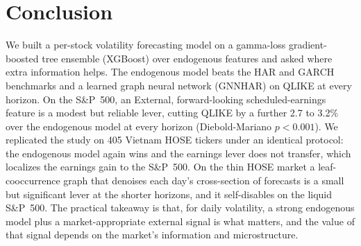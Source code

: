 \documentclass[runningheads]{llncs}
\begin{document}
\section{Conclusion}
We built a per-stock volatility forecasting model on a gamma-loss gradient-boosted tree ensemble
(XGBoost) over endogenous features and asked where extra information helps. The endogenous model beats
the HAR and GARCH benchmarks and a learned graph neural network (GNNHAR) on QLIKE at every horizon. On the
S\&P~500, an External, forward-looking scheduled-earnings feature is a modest but reliable lever, cutting
QLIKE by a further 2.7 to 3.2\% over the endogenous model at every horizon (Diebold-Mariano $p<0.001$).
We replicated the study on 405 Vietnam
HOSE tickers under an identical protocol: the endogenous model again wins and the earnings lever does
not transfer, which localizes the earnings gain to the S\&P~500. On the thin HOSE market a
leaf-cooccurrence graph that denoises each day's cross-section of forecasts is a small but significant
lever at the shorter horizons, and it self-disables on the liquid S\&P~500. The practical takeaway is
that, for daily volatility, a strong endogenous model plus a market-appropriate external signal is what
matters, and the value of that signal depends on the market's information and microstructure.
\end{document}
